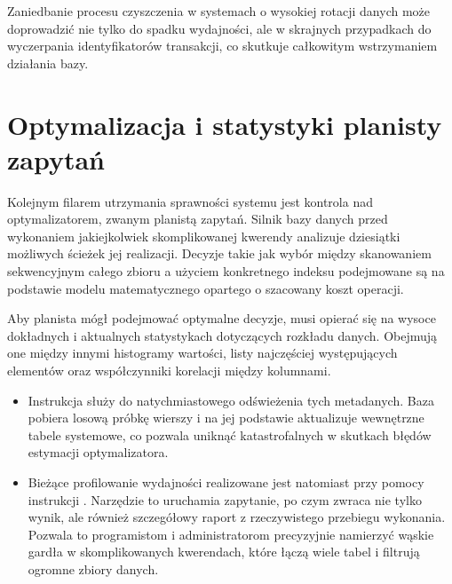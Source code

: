 \documentclass[letterpaper,10pt,english]{sphinxmanual}
\begin{document}
\sphinxAtStartPar
Zaniedbanie procesu czyszczenia w systemach o wysokiej rotacji danych może doprowadzić nie tylko do spadku wydajności, ale w skrajnych przypadkach do wyczerpania identyfikatorów transakcji, co skutkuje całkowitym wstrzymaniem działania bazy.

\begin{sphinxVerbatim}[commandchars=\\\{\}]
\end{sphinxVerbatim}


\section{Optymalizacja i statystyki planisty zapytań}
\label{\detokenize{rozdzial_1/index:optymalizacja-i-statystyki-planisty-zapytan}}
\sphinxAtStartPar
Kolejnym filarem utrzymania sprawności systemu jest kontrola nad optymalizatorem, zwanym planistą zapytań. Silnik bazy danych przed wykonaniem jakiejkolwiek skomplikowanej kwerendy analizuje dziesiątki możliwych ścieżek jej realizacji. Decyzje takie jak wybór między skanowaniem sekwencyjnym całego zbioru a użyciem konkretnego indeksu podejmowane są na podstawie modelu matematycznego opartego o szacowany koszt operacji.

\sphinxAtStartPar
Aby planista mógł podejmować optymalne decyzje, musi opierać się na wysoce dokładnych i aktualnych statystykach dotyczących rozkładu danych. Obejmują one między innymi histogramy wartości, listy najczęściej występujących elementów oraz współczynniki korelacji między kolumnami.
\begin{itemize}
\item {} 
\sphinxAtStartPar
Instrukcja  służy do natychmiastowego odświeżenia tych metadanych. Baza pobiera losową próbkę wierszy i na jej podstawie aktualizuje wewnętrzne tabele systemowe, co pozwala uniknąć katastrofalnych w skutkach błędów estymacji optymalizatora.

\item {} 
\sphinxAtStartPar
Bieżące profilowanie wydajności realizowane jest natomiast przy pomocy instrukcji . Narzędzie to uruchamia zapytanie, po czym zwraca nie tylko wynik, ale również szczegółowy raport z rzeczywistego przebiegu wykonania. Pozwala to programistom i administratorom precyzyjnie namierzyć wąskie gardła w skomplikowanych kwerendach, które łączą wiele tabel i filtrują ogromne zbiory danych.

\end{itemize}
\end{document}
